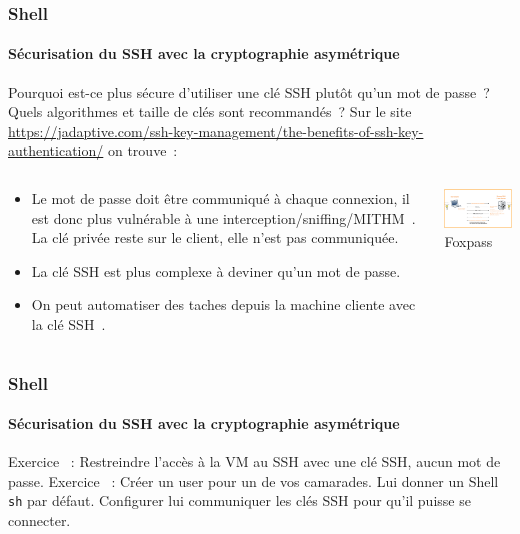 \documentclass{beamer}
\begin{document}
    \begin{frame}
        \frametitle{Shell}
        \framesubtitle{Sécurisation du SSH avec la cryptographie asymétrique}
        \transdissolve
        Pourquoi est-ce plus sécure d'utiliser une clé SSH plutôt qu'un mot de passe~?
        \bigbreak
        Quels algorithmes et taille de clés sont recommandés~?
        \pause
        \bigbreak
        Sur le site \url{https://jadaptive.com/ssh-key-management/the-benefits-of-ssh-key-authentication/} on trouve~:
        \begin{columns}
            \begin{column}{0.6\textwidth}
                \begin{itemize}
                    \item Le mot de passe doit être communiqué à chaque connexion, il est donc plus vulnérable à une interception/sniffing/MITHM~.
                    La clé privée reste sur le client, elle n'est pas communiquée.
                    \item La clé SSH est plus complexe à deviner qu'un mot de passe.
                    \item On peut automatiser des taches depuis la machine cliente avec la clé SSH~.
                \end{itemize}
            \end{column}
            \begin{column}{0.4\textwidth}
                \centering
                \includegraphics[width=5cm]{image/ssh-key-diagram} \\ Foxpass\footnotemark \\
            \end{column}
        \end{columns}
    \end{frame}

    \begin{frame}
        \frametitle{Shell}
        \framesubtitle{Sécurisation du SSH avec la cryptographie asymétrique}
        \transdissolve
        Exercice \execcounterdispinc{}~:
        Restreindre l'accès à la VM au SSH avec une clé SSH, aucun mot de passe.
        \bigbreak
        Exercice \execcounterdispinc{}~:
        Créer un user pour un de vos camarades.
        Lui donner un Shell \lstinline{sh} par défaut.
        Configurer lui communiquer les clés SSH pour qu'il puisse se connecter.
    \end{frame}
\end{document}
